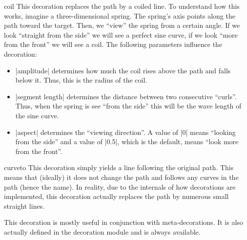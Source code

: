 \begin{decoration}{coil}
    This decoration replaces the path by a coiled line. To understand how this
    works, imagine a three-dimensional spring. The spring's axis points along
    the path toward the target. Then, we ``view'' the spring from a certain
    angle. If we look ``straight from the side'' we will see a perfect sine
    curve, if we look ``more from the front'' we will see a coil. The following
    parameters influence the decoration:
    \begin{itemize}
        \item |amplitude| determines how much the coil rises above the path and
            falls below it. Thus, this is the radius of the coil.
        \item |segment length| determines the distance between two consecutive
            ``curls''. Thus, when the spring is see ``from the side'' this will
            be the wave length of the sine curve.
        \item |aspect| determines the ``viewing direction''. A value of |0|
            means ``looking from the side'' and a value of |0.5|, which is the
            default, means ``look more from the front''.
    \end{itemize}
\begin{codeexample}[]
\end{codeexample}
\begin{codeexample}[]
\end{codeexample}
\end{decoration}

\begin{decoration}{curveto}
    This decoration simply yields a line following the original path. This
    means that (ideally) it does not change the path and follows any curves in
    the path (hence the name). In reality, due to the internals of how
    decorations are implemented, this decoration actually replaces the path by
    numerous small straight lines.

    This decoration is mostly useful in conjunction with meta-decorations. It
    is also actually defined in the decoration module and is always available.
\begin{codeexample}[]
\end{codeexample}
\end{decoration}

